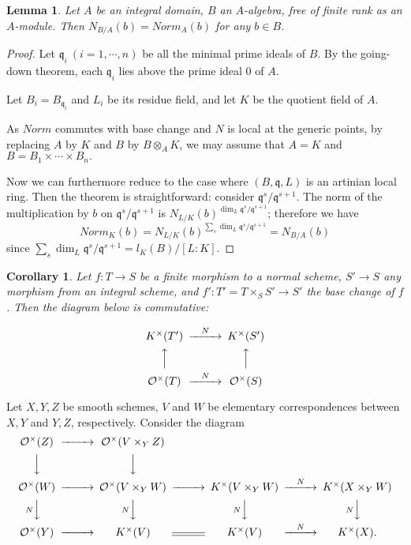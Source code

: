 \documentclass{article}
\theoremstyle{theorem}
\newtheorem{lemma}[theorem]{Lemma}
\newtheorem{corollary}[theorem]{Corollary}
\theoremstyle{definition}
\begin{document}
    \begin{lemma}
        Let $A$ be an integral domain, $B$ an $A$-algebra, free of finite rank as an $A$-module. Then $N_{B/A}(b) = Norm_A(b)$ for any $b \in B$.
    \end{lemma}
    \begin{proof}
        Let $\mathfrak q_i \ (i = 1, \cdots, n)$ be all the minimal prime ideals of $B$. By the going-down theorem, each $\mathfrak q_i$ lies above the prime ideal $0$ of $A$.
        
        Let $B_i = B_{\mathfrak q_i}$ and $L_i$ be its residue field, and let $K$ be the quotient field of $A$.
        
        As $Norm$ commutes with base change and $N$ is local at the generic points, by replacing $A$ by $K$ and $B$ by $B \otimes_A K$, we may assume that $A = K$ and $B = B_1 \times \cdots \times B_n.$
        
        Now we can furthermore reduce to the case where $(B, \mathfrak q, L)$ is an artinian local ring. Then the theorem is straightforward: consider $\mathfrak q^s / \mathfrak q^{s+1}.$ The norm of the multiplication by $b$ on $\mathfrak q^s / \mathfrak q^{s+1}$ is $N_{L/K}(b)^{\dim_L \mathfrak q^s / \mathfrak q^{s+1}}$; therefore we have 
        $$Norm_K(b) = N_{L/K}(b)^{\sum_s \dim_L \mathfrak q^s / \mathfrak q^{s+1}} = N_{B/A}(b)$$
        since $\sum_s \dim_L \mathfrak q^s / \mathfrak q^{s+1} = l_K(B) / [L:K].$
    \end{proof}
    
    \begin{corollary}
        Let $f: T \rightarrow S$ be a finite morphism to a normal scheme, $S' \rightarrow S$ any morphism from an integral scheme, and $f' : T' = T \times_S S' \rightarrow S'$ the base change of $f$. Then the diagram below is commutative:
        
        $$\begin{CD}
           K^\times(T') @>{N}>>               K^\times(S') \\
                @AAA                             @AAA \\
           \mathcal O^\times(T)  @>{N}>>  \mathcal O^\times(S)
        \end{CD}$$
    \end{corollary}
    
    
    Let $X, Y, Z$ be smooth schemes, $V$ and $W$ be elementary correspondences between $X,Y$ and $Y,Z$, respectively. Consider the diagram
    $$
    \begin{CD}
        \mathcal O^\times(Z) @>>> \mathcal O^\times(V\times_YZ)\\
        @VVV @VVV\\
        \mathcal O^\times(W) @>>> \mathcal O^\times(V\times_YW) @>>> K^\times(V\times_YW) @>{N}>> K^\times(X\times_YW)\\
        @VNVV @VNVV @VNVV @VNVV\\
        \mathcal O^\times(Y) @>>> K^\times(V) @= K^\times(V) @>N>> K^\times(X).
    \end{CD}
    $$
    
\end{document}
